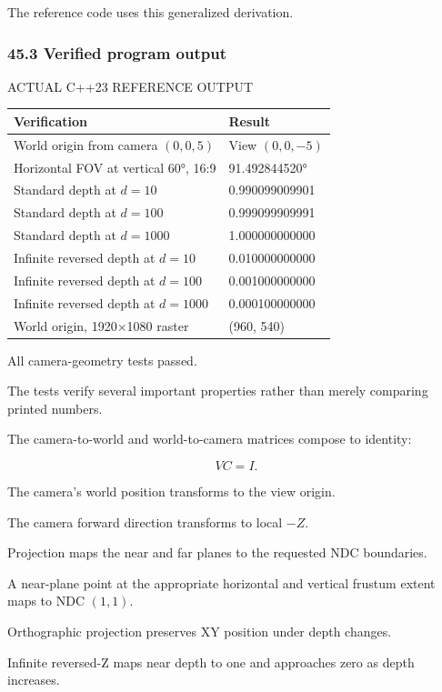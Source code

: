 The reference code uses this generalized derivation.

\subsubsection{45.3 Verified program output}\label{verified-program-output}

ACTUAL C++23 REFERENCE OUTPUT

{\def\LTcaptype{none} %
\begin{longtable}[]{@{}ll@{}}
\toprule\noalign{}
Verification & Result \\
\midrule\noalign{}
\endhead
\bottomrule\noalign{}
\endlastfoot
World origin from camera \((0,0,5)\) & View \((0,0,-5)\) \\
Horizontal FOV at vertical 60°, 16:9 & 91.492844520° \\
Standard depth at \(d=10\) & 0.990099009901 \\
Standard depth at \(d=100\) & 0.999099909991 \\
Standard depth at \(d=1000\) & 1.000000000000 \\
Infinite reversed depth at \(d=10\) & 0.010000000000 \\
Infinite reversed depth at \(d=100\) & 0.001000000000 \\
Infinite reversed depth at \(d=1000\) & 0.000100000000 \\
World origin, 1920×1080 raster & (960, 540) \\
\end{longtable}
}

All camera-geometry tests passed.

The tests verify several important properties rather than merely comparing printed numbers.

The camera-to-world and world-to-camera matrices compose to identity:

\[
 \boxed{VC=I}.
\]

The camera's world position transforms to the view origin.

The camera forward direction transforms to local \(-Z\).

Projection maps the near and far planes to the requested NDC boundaries.

A near-plane point at the appropriate horizontal and vertical frustum extent maps to NDC \((1,1)\).

Orthographic projection preserves XY position under depth changes.

Infinite reversed-Z maps near depth to one and approaches zero as depth increases.

